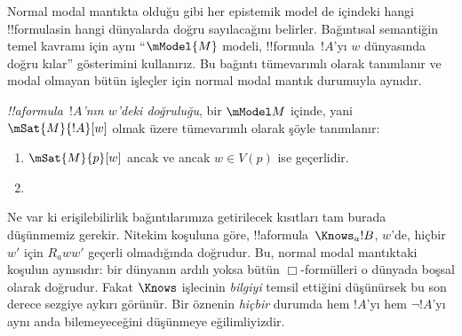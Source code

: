 \documentclass[../../../include/open-logic-section]{subfiles}
\begin{document}


Normal modal mantıkta olduğu gibi her epistemik model de içindeki hangi
!!{formula}s{}in hangi dünyalarda doğru sayılacağını belirler. Bağıntısal
semantiğin temel kavramı için aynı ``$\mModel{M}$ modeli, !!{formula}~$!A$'yı
$w$ dünyasında doğru kılar'' gösterimini kullanırız. Bu bağıntı tümevarımlı
olarak tanımlanır ve modal olmayan bütün işleçler için normal modal mantık
durumuyla aynıdır.

\begin{defn}
  \emph{!!a{formula}~$!A$'nın $w$'deki doğruluğu}, bir $\mModel M$ içinde,
  yani $\mSat{M}{!A}[w]$ olmak üzere tümevarımlı olarak şöyle tanımlanır:
  \begin{enumerate}
  \item $\mSat{M}{p}[w]$ ancak ve ancak $w \in V(p)$ ise geçerlidir.
  \item{}
  \end{enumerate} 
\end{defn}

Ne var ki erişilebilirlik bağıntılarımıza getirilecek kısıtları tam burada
düşünmemiz gerekir. Nitekim  koşuluna göre,
!!a{formula}~$\Knows_a !B$, $w$'de, hiçbir $w'$ için $R_a ww'$ geçerli
olmadığında doğrudur. Bu, normal modal mantıktaki koşulun aynısıdır: bir dünyanın
ardılı yoksa bütün $\Box$-formülleri o dünyada boşsal olarak doğrudur. Fakat
$\Knows$ işlecinin \emph{bilgiyi} temsil ettiğini düşünürsek bu son derece
sezgiye aykırı görünür. Bir öznenin \emph{hiçbir} durumda hem $!A$'yı hem
$\lnot !A$'yı aynı anda bilemeyeceğini düşünmeye eğilimliyizdir.
\end{document}
